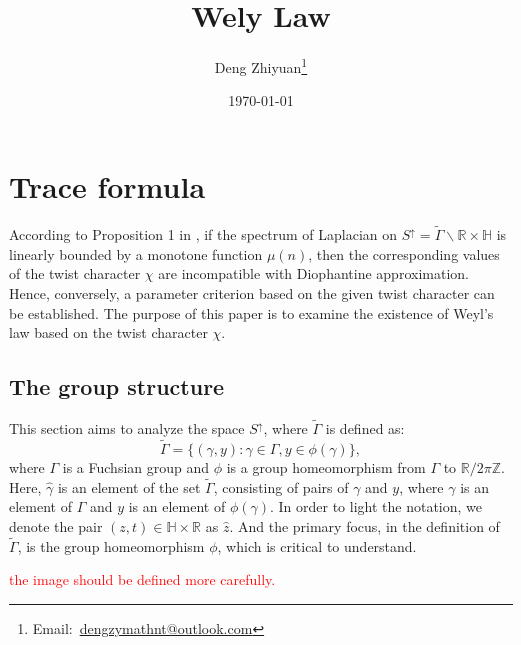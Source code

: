 \documentclass[12pt,a4paper,english]{article}
\title{Wely Law}
\date{\today}
\author{Deng Zhiyuan\footnote{Email:\ \href{mailto:dengzymathnt@outlook.com}{dengzymathnt@outlook.com}}}
\theoremstyle{plain}
\theoremstyle{definition}
\theoremstyle{remark}
\newcommand{\RR}{\mathbb{R}}
\newcommand{\HH}{\mathbb{H}}
\newcommand{\ZZ}{\mathbb{Z}}
\begin{document}
\maketitle
\newpage

\tableofcontents
\newpage

\section{Trace formula}

According to Proposition 1 in \cite{hoffmann1991cuspidal}, if the spectrum of Laplacian on $S^{\uparrow}=\tilde{\Gamma}\backslash\mathbb{R}\times\mathbb{H}$ is linearly bounded by a monotone function $\mu(n)$, then the corresponding values of the twist character $\chi$ are incompatible with Diophantine approximation. Hence, conversely, a parameter criterion based on the given twist character can be established. The purpose of this paper is to examine the existence of Weyl's law based on the twist character $\chi$.

\subsection{The group structure}
This section aims to analyze the space $S^{\uparrow}$, where $\tilde{\Gamma}$ is defined as: \begin{equation}\label{biggergamma}
\tilde{\Gamma}=\{(\gamma, y): \gamma\in \Gamma, y\in \phi(\gamma)\},
\end{equation} where $\Gamma$ is a Fuchsian group and $\phi$ is a group homeomorphism from $\Gamma$ to $\RR/2\pi\ZZ$. Here, $\hat{\gamma}$ is an element of the set $\tilde{\Gamma}$, consisting of pairs of $\gamma$ and $y$, where $\gamma$ is an element of $\Gamma$ and $y$ is an element of $\phi(\gamma)$.
In order to light the notation, we denote the pair $(z,t)\in \HH\times \RR $ as $\hat{z}$. And the primary focus, in the definition of $\tilde{\Gamma}$, is the group homeomorphism $\phi$, which is critical to understand. 
\begin{center}
\end{center}

\textcolor{red}{the image should be defined more carefully.}
\end{document}
